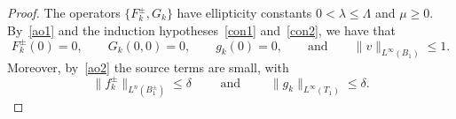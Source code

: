 \documentclass[letter,11pt]{amsart}
\theoremstyle{definition}
\numberwithin{equation}{section}
\begin{document}
\begin{proof}
\medskip

The operators $\{F_{k}^{\pm}, G_k\}$ have ellipticity constants $0 < \lambda \leq \Lambda$ and $\mu \geq 0$.
By~\eqref{ao1} and the induction hypotheses~\eqref{con1} and~\eqref{con2}, we have that
\begin{equation}
\label{oa1}
F_{k}^{\pm}(0) = 0, \qquad G_{k}(0,0) = 0, \qquad g_{k}(0) = 0, \qquad 
\text{and} \qquad 
\|v\|_{L^{\infty}(B_1)} \leq 1.
\end{equation}
Moreover, by~\eqref{ao2} the source terms are small, with
\begin{equation}
\label{oa2}
\|f_k^{\pm}\|_{L^{n}(B_1^{\pm})} \leq \delta \qquad \text{ and } \qquad \|g_k\|_{L^{\infty}(T_1)} \leq \delta.
\end{equation}

\medskip


\end{proof}
\end{document}

